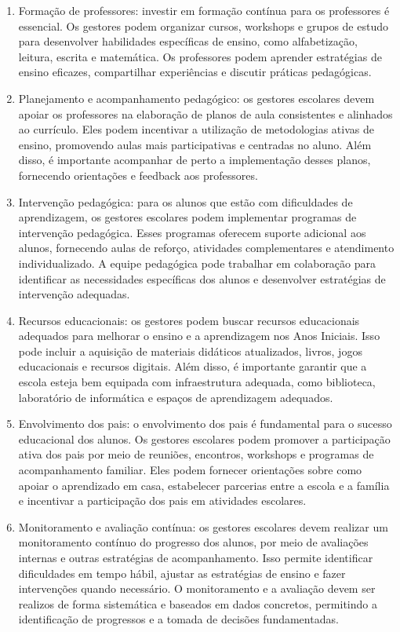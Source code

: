 \begin{enumerate}
\def\labelenumi{\arabic{enumi}.}
\setcounter{enumi}{1}
\item
  Formação de professores: investir em formação contínua para os
  professores é essencial. Os gestores podem organizar cursos, workshops
  e grupos de estudo para desenvolver habilidades específicas de ensino,
  como alfabetização, leitura, escrita e matemática. Os professores
  podem aprender estratégias de ensino eficazes, compartilhar
  experiências e discutir práticas pedagógicas.
\item
  Planejamento e acompanhamento pedagógico: os gestores escolares devem
  apoiar os professores na elaboração de planos de aula consistentes e
  alinhados ao currículo. Eles podem incentivar a utilização de
  metodologias ativas de ensino, promovendo aulas mais participativas e
  centradas no aluno. Além disso, é importante acompanhar de perto a
  implementação desses planos, fornecendo orientações e feedback aos
  professores.
\item
  Intervenção pedagógica: para os alunos que estão com dificuldades de
  aprendizagem, os gestores escolares podem implementar programas de
  intervenção pedagógica. Esses programas oferecem suporte adicional aos
  alunos, fornecendo aulas de reforço, atividades complementares e
  atendimento individualizado. A equipe pedagógica pode trabalhar em
  colaboração para identificar as necessidades específicas dos alunos e
  desenvolver estratégias de intervenção adequadas.
\item
  Recursos educacionais: os gestores podem buscar recursos educacionais
  adequados para melhorar o ensino e a aprendizagem nos Anos Iniciais.
  Isso pode incluir a aquisição de materiais didáticos atualizados,
  livros, jogos educacionais e recursos digitais. Além disso, é
  importante garantir que a escola esteja bem equipada com
  infraestrutura adequada, como biblioteca, laboratório de informática e
  espaços de aprendizagem adequados.
\item
  Envolvimento dos pais: o envolvimento dos pais é fundamental para o
  sucesso educacional dos alunos. Os gestores escolares podem promover a
  participação ativa dos pais por meio de reuniões, encontros, workshops
  e programas de acompanhamento familiar. Eles podem fornecer
  orientações sobre como apoiar o aprendizado em casa, estabelecer
  parcerias entre a escola e a família e incentivar a participação dos
  pais em atividades escolares.
\item
  Monitoramento e avaliação contínua: os gestores escolares devem
  realizar um monitoramento contínuo do progresso dos alunos, por meio
  de avaliações internas e outras estratégias de acompanhamento. Isso
  permite identificar dificuldades em tempo hábil, ajustar as
  estratégias de ensino e fazer intervenções quando necessário. O
  monitoramento e a avaliação devem ser realizos de forma sistemática e
  baseados em dados concretos, permitindo a identificação de progressos
  e a tomada de decisões fundamentadas.
\end{enumerate}

